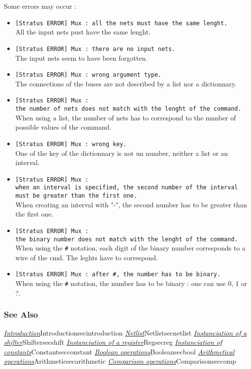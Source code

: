 Some errors may occur :
\begin{itemize}
    \item \verb-[Stratus ERROR] Mux : all the nets must have the same lenght.-\\All the input nets pust have the same lenght.
    \item \verb-[Stratus ERROR] Mux : there are no input nets.-\\The input nets seem to have been forgotten.
    \item \verb-[Stratus ERROR] Mux : wrong argument type.-\\The connections of the buses are not described by a list nor a dictionnary.
    \item \verb-[Stratus ERROR] Mux :-\\\verb-the number of nets does not match with the lenght of the command.-\\When using a list, the number of nets has to correspond to the number of possible values of the command.
    \item \verb-[Stratus ERROR] Mux : wrong key.-\\One of the key of the dictionnary is not un number, neither a list or an interval.
    \item \verb-[Stratus ERROR] Mux :-\\\verb-when an interval is specified, the second number of the interval-\\\verb-must be greater than the first one.-\\When creating an interval with "-", the second number has to be greater than the first one.
    \item \verb-[Stratus ERROR] Mux :-\\\verb-the binary number does not match with the lenght of the command.-\\When using the \verb-#- notation, each digit of the binary number corresponds to a wire of the cmd. The leghts have to correspond.
    \item \verb-[Stratus ERROR] Mux : after #, the number has to be binary.-\\When using the \verb-#- notation, the number has to be binary : one can use 0, 1 or ?.
\end{itemize}

\begin{htmlonly}

\subsubsection{See Also}

\hyperref[ref]{\emph{Introduction}}{}{Introduction}{secintroduction}
\hyperref[ref]{\emph{Netlist}}{}{Netlist}{secnetlist}
\hyperref[ref]{\emph{Instanciation of a shifter}}{}{Shifter}{secshift}
\hyperref[ref]{\emph{Instanciation of a register}}{}{Reg}{secreg}
\hyperref[ref]{\emph{Instanciation of constants}}{}{Constant}{secconstant}
\hyperref[ref]{\emph{Boolean operations}}{}{Boolean}{secbool}
\hyperref[ref]{\emph{Arithmetical operations}}{}{Arithmetic}{secarithmetic}
\hyperref[ref]{\emph{Comparison operations}}{}{Comparison}{seccomp}

\end{htmlonly}
